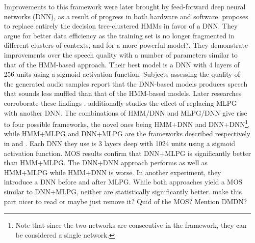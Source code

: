 \documentclass[a4paper, oneside]{article}
\begin{document}
Improvements to this framework were later brought by feed-forward deep neural networks (DNN), as a result of progress in both hardware and software. \citep{SPSSDNN} proposes to replace entirely the decision tree-clustered HMMs in favor of a DNN. They argue for better data efficiency as the training set is no longer fragmented in different clusters of contexts\color{red}, and for a more powerful model?\color{black}. They demonstrate improvements over the speech quality with a number of parameters similar to that of the HMM-based approach. Their best model is a DNN with 4 layers of 256 units using a sigmoid activation function. Subjects assessing the quality of the generated audio samples report that the DNN-based models produces speech that sounds less muffled than that of the HMM-based models. Later researches corroborate these findings \citep{OnTheTrainingAspects}. \citep{Hashimoto-2015} additionally studies the effect of replacing MLPG with another DNN. The combinations of HMM/DNN and MLPG/DNN give rise to four possible frameworks, the novel ones being HMM+DNN and DNN+DNN\footnote{Note that since the two networks are consecutive in the framework, they can be considered a single network.}, while HMM+MLPG and DNN+MLPG are the frameworks described respectively in \citep{Tokuda-2013} and \citep{SPSSDNN}. Each DNN they use is 3 layers deep with 1024 units using a sigmoid activation function. MOS results confirm that DNN+MLPG is significantly better than HMM+MLPG. The DNN+DNN approach performs as well as HMM+MLPG while HMM+DNN is worse. In another experiment, they introduce a DNN before and after MLPG. While both approaches yield a MOS similar to DNN+MLPG, neither are statistically significantly better. \color{red} make this part nicer to read or maybe just remove it? Quid of the MOS? Mention DMDN?\color{black}

\end{document}
